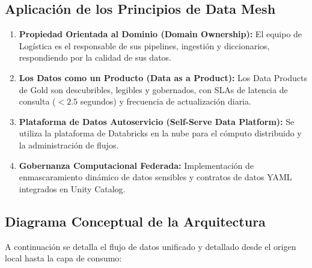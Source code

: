 \documentclass[11pt,a4paper]{article}
\begin{document}
\subsection{Aplicación de los Principios de Data Mesh}
\begin{enumerate}
    \item \textbf{Propiedad Orientada al Dominio (Domain Ownership):} El equipo de Logística es el responsable de sus pipelines, ingestión y diccionarios, respondiendo por la calidad de sus datos.
    \item \textbf{Los Datos como un Producto (Data as a Product):} Los Data Products de Gold son descubribles, legibles y gobernados, con SLAs de latencia de consulta ($<2.5$ segundos) y frecuencia de actualización diaria.
    \item \textbf{Plataforma de Datos Autoservicio (Self-Serve Data Platform):} Se utiliza la plataforma de Databricks en la nube para el cómputo distribuido y la administración de flujos.
    \item \textbf{Gobernanza Computacional Federada:} Implementación de enmascaramiento dinámico de datos sensibles y contratos de datos YAML integrados en Unity Catalog.
\end{enumerate}

\subsection{Diagrama Conceptual de la Arquitectura}
A continuación se detalla el flujo de datos unificado y detallado desde el origen local hasta la capa de consumo:
\end{document}
